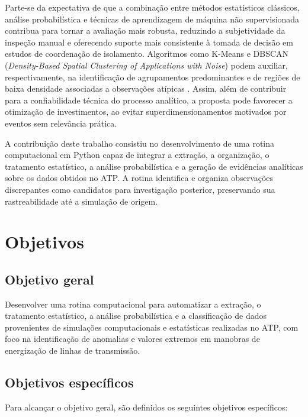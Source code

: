 \documentclass[
	12pt,				%
	openright,			%
	oneside,			%
	a4paper,			%
	chapter=TITLE,		%
	section=TITLE,		%
	subsection=TITLE,	%
	subsubsection=TITLE,%
	english,			%
	brazilian			%
	]{abntex2}
\theoremstyle{definition}
\begin{document}
Parte-se da expectativa de que a combinação entre métodos estatísticos clássicos, análise probabilística e técnicas de aprendizagem de máquina não supervisionada contribua para tornar a avaliação mais robusta, reduzindo a subjetividade da inspeção manual e oferecendo suporte mais consistente à tomada de decisão em estudos de coordenação de isolamento. Algoritmos como K-Means e DBSCAN (\textit{Density-Based Spatial Clustering of Applications with Noise}) podem auxiliar, respectivamente, na identificação de agrupamentos predominantes e de regiões de baixa densidade associadas a observações atípicas \cite{ardebili2024}. Assim, além de contribuir para a confiabilidade técnica do processo analítico, a proposta pode favorecer a otimização de investimentos, ao evitar superdimensionamentos motivados por eventos sem relevância prática.

A contribuição deste trabalho consistiu no desenvolvimento de uma rotina computacional em Python capaz de integrar a extração, a organização, o tratamento estatístico, a análise probabilística e a geração de evidências analíticas sobre os dados obtidos no ATP. A rotina identifica e organiza observações discrepantes como candidatos para investigação posterior, preservando sua rastreabilidade até a simulação de origem.


\section{Objetivos}

\subsection{Objetivo geral}


Desenvolver uma rotina computacional para automatizar a extração, o tratamento estatístico, a análise probabilística e a classificação de dados provenientes de simulações computacionais e estatísticas realizadas no ATP, com foco na identificação de anomalias e valores extremos em manobras de energização de linhas de transmissão.


\subsection{Objetivos específicos}


Para alcançar o objetivo geral, são definidos os seguintes objetivos específicos:
\end{document}
